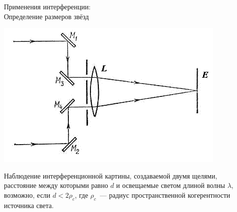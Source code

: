 \documentclass[usenames,dvipsnames,pdftex,unicode,hidelinks]{beamer}
\begin{document}
  \begin{frame}{Применения интерференции:\\ Определение размеров звёзд}
    \begin{center}
      \includegraphics[height=0.5\textheight]{star-size}
      \begin{block}{}
        Наблюдение интерференционной картины, создаваемой двумя щелями, расстояние между которыми
        равно $d$ и освещаемые светом длиной волны $\lambda$, возможно, если $d < 2 \rho_c$, где
        $\rho_c$~--- радиус пространственной когерентности источника света.
      \end{block}
    \end{center}
  \end{frame}
\end{document}
